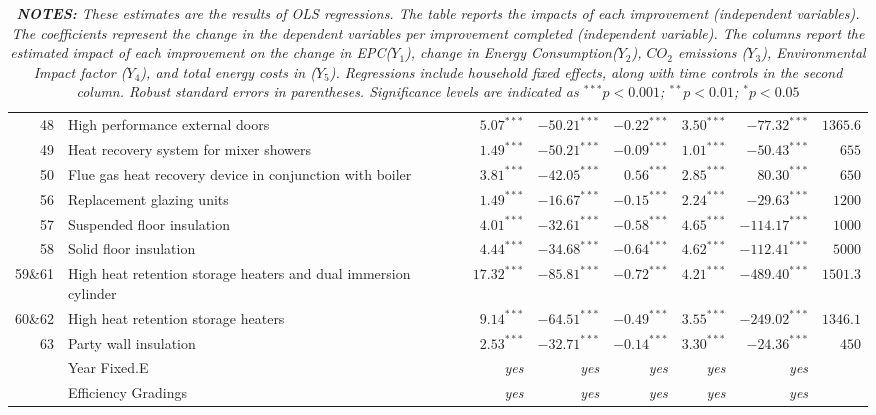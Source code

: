\begin{table}[h!]
\begin{center}
{\begin{tabular}{r p{5cm} rrrrr | r}
48 & High performance external doors & $5.07^{***}$ & $-50.21^{***}$ & $-0.22^{***}$ & $3.50^{***}$ & $-77.32^{***}$ & $1365.6$ \\ 
49 & Heat recovery system for mixer showers & $1.49^{***}$ & $-50.21^{***}$ & $-0.09^{***}$ & $1.01^{***}$ & $-50.43^{***}$ & $655$\\ 
50 & Flue gas heat recovery device in conjunction with boiler & $3.81^{***}$ & $-42.05^{***}$ & $0.56^{***}$ & $2.85^{***}$ & $80.30^{***}$ & $650$\\ 
56 & Replacement glazing units  & $1.49^{***}$ & $-16.67^{***}$ & $-0.15^{***}$ & $2.24^{***}$ & $-29.63^{***}$ & $1200$\\ 
57 & Suspended floor insulation  & $4.01^{***}$ & $-32.61^{***}$ & $-0.58^{***}$ & $4.65^{***}$ & $-114.17^{***}$ & $1000$\\ 
58 & Solid floor insulation & $4.44^{***}$ & $-34.68^{***}$ & $-0.64^{***}$ & $4.62^{***}$ & $-112.41^{***}$ & $5000$\\ 
59\&61 & High heat retention storage heaters and dual immersion cylinder & $17.32^{***}$ & $-85.81^{***}$ & $-0.72^{***}$ & $4.21^{***}$ & $-489.40^{***}$ & $1501.3$\\ 
60\&62 & High heat retention storage heaters & $9.14^{***}$ & $-64.51^{***}$ & $-0.49^{***}$ & $3.55^{***}$ & $-249.02^{***}$ & $1346.1$\\ 
63 & Party wall insulation & $2.53^{***}$ & $-32.71^{***}$ & $-0.14^{***}$ & $3.30^{***}$ & $-24.36^{***}$ & $450$\\
\addlinespace
\midrule
& Year Fixed.E     & \textit{yes}    & \textit{yes}  & \textit{yes} & \textit{yes} & \textit{yes} \\
& Efficiency Gradings    & \textit{yes}    & \textit{yes}  & \textit{yes} & \textit{yes} & \textit{yes} \\
\bottomrule
\bottomrule
\end{tabular}
}
\end{center}
\caption*{\scriptsize{\textit{\small{\textbf{NOTES:} These estimates are the results of OLS regressions. The table reports the impacts of each improvement (independent variables). The coefficients represent the change in the dependent variables per improvement completed (independent variable). The columns report the estimated impact of each improvement on the change in EPC($Y_1$), change in Energy Consumption($Y_2$), $CO_2$ emissions ($Y_3$), Environmental Impact factor ($Y_4$), and total energy costs in ($Y_5$). Regressions include household fixed effects, along with time controls in the second column. Robust standard errors in parentheses. Significance levels are indicated as $^{***}p<0.001$; $^{**}p<0.01$; $^{*}p<0.05$}}}}

\end{table}
